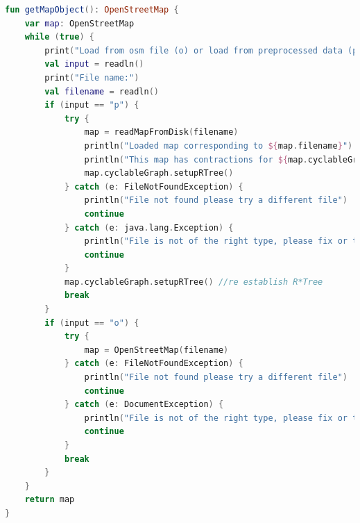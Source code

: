\documentclass[11pt,twoside,a4paper]{report}
\begin{document}
\begin{lstlisting}[language=kotlin]
fun getMapObject(): OpenStreetMap {
    var map: OpenStreetMap
    while (true) {
        print("Load from osm file (o) or load from preprocessed data (p):")
        val input = readln()
        print("File name:")
        val filename = readln()
        if (input == "p") {
            try {
                map = readMapFromDisk(filename)
                println("Loaded map corresponding to ${map.filename}")
                println("This map has contractions for ${map.cyclableGraph.contractedGraphs.keys}")
                map.cyclableGraph.setupRTree()
            } catch (e: FileNotFoundException) {
                println("File not found please try a different file")
                continue
            } catch (e: java.lang.Exception) {
                println("File is not of the right type, please fix or try a different file")
                continue
            }
            map.cyclableGraph.setupRTree() //re establish R*Tree
            break
        }
        if (input == "o") {
            try {
                map = OpenStreetMap(filename)
            } catch (e: FileNotFoundException) {
                println("File not found please try a different file")
                continue
            } catch (e: DocumentException) {
                println("File is not of the right type, please fix or try a different file")
                continue
            }
            break
        }
    }
    return map
}


\end{lstlisting}
\end{document}
